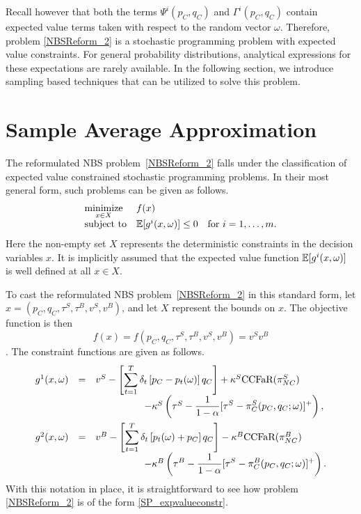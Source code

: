 Recall however that both the terms $\Psi^i(p_C, q_C)$ and $\Gamma^i(p_C, q_C)$
contain expected value terms taken with respect to the random vector $\omega$. Therefore,
problem \eqref{NBSReform_2} is a stochastic programming problem with expected
value constraints. For general probability distributions, analytical expressions
for these expectations are rarely available. In the following section, we
introduce sampling based techniques that can be utilized to solve this
problem.

\section{Sample Average Approximation}

The reformulated NBS problem~\eqref{NBSReform_2} falls under the classification
of expected value constrained stochastic programming problems. In their most
general form, such problems can be given as follows.
\begin{equation} \label{SP_expvalueconstr}
\begin{array}{ll}
\displaystyle\mathop{\hbox{\rm minimize}}_{x \in X} & f(x) \\
\mathrm{subject\ to} & \mathbb{E} [g^i(x,\omega)] \leq 0 \quad \text{for } i = 1, \ldots, m.
\end{array}
\end{equation}
Here the non-empty set $X$ represents the deterministic constraints in the
decision variables $x$. It is implicitly assumed that the expected value
function $\mathbb{E} [g^i(x,\omega)]$ is well defined at all $x \in X$. 

To cast the reformulated NBS problem~\eqref{NBSReform_2} in this standard form,
let $x = (p_C, q_C, \tau^S, \tau^B, v^S, v^B)$, and let $X$ represent the bounds
on $x$. The objective function is then $$f(x) = f(p_C, q_C, \tau^S, \tau^B, v^S,
v^B) = v^S v^B$$. The constraint functions are given as follows.
\begin{equation} \label{constr_funs}
\begin{array}{rcl}
g^1(x, \omega) & = & v^S - \left[\displaystyle \sum_{t=1}^T \delta_t \left[p_C -
p_t(\omega) \right]q_C \right]  + \kappa^S \text{CCFaR}(\pi_{NC}^S) \\
& & \quad \quad \quad \quad \quad - \kappa^S
\left( \tau^S - \displaystyle \frac{1}{1 - \alpha} [\tau^S - \pi_C^S(p_C, q_C; \omega)]^+
\right), \\ [10pt]
g^2(x, \omega) & = & v^B - \left[ \displaystyle \sum_{t=1}^T \delta_t
\left[p_t(\omega) + p_C\right]q_C \right] - \kappa^B \text{CCFaR}(\pi_{NC}^B) \\
& & \quad \quad \quad \quad \quad 
- \kappa^B \left( \displaystyle \tau^B - \frac{1}{1 - \alpha} [\tau^S - \pi_C^B(p_C, q_C;
\omega)]^+ \right). 
\end{array}
\end{equation}
With this notation in place, it is straightforward to see how problem
\eqref{NBSReform_2} is of the form \eqref{SP_expvalueconstr}. 

